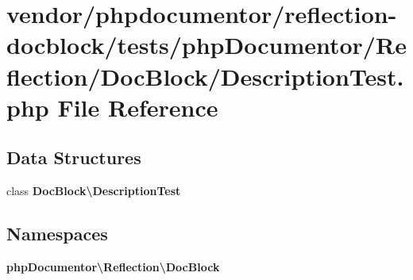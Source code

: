 \section{vendor/phpdocumentor/reflection-\/docblock/tests/php\+Documentor/\+Reflection/\+Doc\+Block/\+Description\+Test.php File Reference}
\label{_description_test_8php}
\subsection*{Data Structures}
\begin{DoxyCompactItemize}
\item 
class {\bf Doc\+Block\textbackslash{}\+Description\+Test}
\end{DoxyCompactItemize}
\subsection*{Namespaces}
\begin{DoxyCompactItemize}
\item 
 {\bf php\+Documentor\textbackslash{}\+Reflection\textbackslash{}\+Doc\+Block}
\end{DoxyCompactItemize}
